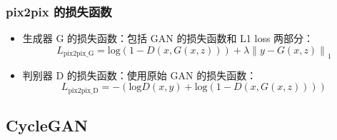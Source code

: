 \subsubsection{pix2pix 的损失函数}
\begin{itemize}
  \item 生成器 G 的损失函数：包括 GAN 的损失函数和 L1 loss 两部分：
    \begin{equation}
      L_{\mathrm{pix2pix\_G}} = \mathrm{log}(1 - D(x, G(x, z))) + \lambda \left\| y - G(x, z) \right\|_1
    \end{equation}
  \item 判别器 D 的损失函数：使用原始 GAN 的损失函数：
    \begin{equation}
      L_{\mathrm{pix2pix\_D}} = -(\mathrm{log}D(x, y) + \mathrm{log}(1 - D(x, G(x, z))))
    \end{equation}
\end{itemize}

\subsection{CycleGAN}


